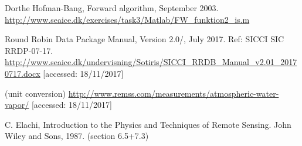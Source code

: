 \documentclass[11pt, a4paper]{article}
\begin{document}
\newpage
\begin{thebibliography}{99}
	 Dorthe Hofman-Bang, Forward algorithm, September 2003. \newline \url{http://www.seaice.dk/exercises/task3/Matlab/FW_funktion2_is.m} \newline [accessed: 18/11/2017]
	
	
	 Round Robin Data Package Manual, Version 2.0/, July 2017. Ref: SICCI SIC RRDP-07-17. \newline
	\url{http://www.seaice.dk/undervisning/Sotiris/SICCI_RRDB_Manual_v2.01_20170717.docx} [accessed: 18/11/2017]
	
	 (unit conversion) \url{http://www.remss.com/measurements/atmospheric-water-vapor/} [accessed: 18/11/2017]
	
	  C. Elachi, Introduction to the Physics and Techniques of Remote Sensing. John Wiley and Sons, 1987. (section 6.5+7.3)
	
\end{thebibliography}
\end{document}
